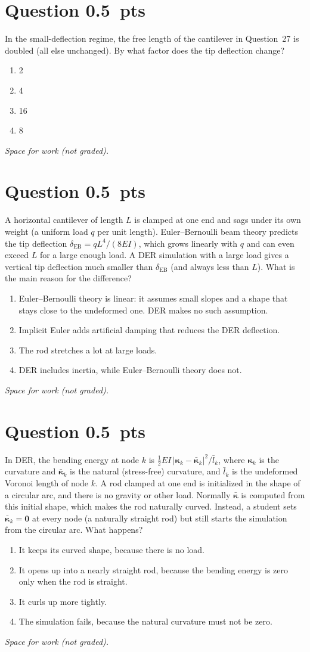 \documentclass[letterpaper,11pt]{article}
\newcounter{qnum}
\newcommand{\qpts}{0.5}
\newcommand{\mcq}[5]{%
  \clearpage
  \stepcounter{qnum}%
  \section*{Question \theqnum \hfill \normalsize \qpts~pts}
  #1
  \begin{enumerate}[label=(\alph*)]
    \item #2
    \item #3
    \item #4
    \item #5
  \end{enumerate}
  \vspace{3mm}

  \textit{Space for work (not graded).}
}
\begin{document}
%
%
\mcq{In the small-deflection regime, the free length of the cantilever in Question~27 is doubled (all else unchanged). By what factor does the tip deflection change?}
  {2}
  {4}
  {16}
  {8}

%
%
\mcq{A horizontal cantilever of length $L$ is clamped at one end and sags under its own weight (a uniform load $q$ per unit length). Euler--Bernoulli beam theory predicts the tip deflection $\delta_{\text{EB}} = qL^4/(8EI)$, which grows linearly with $q$ and can even exceed $L$ for a large enough load. A DER simulation with a large load gives a vertical tip deflection much smaller than $\delta_{\text{EB}}$ (and always less than $L$). What is the main reason for the difference?}
  {Euler--Bernoulli theory is linear: it assumes small slopes and a shape that stays close to the undeformed one. DER makes no such assumption.}
  {Implicit Euler adds artificial damping that reduces the DER deflection.}
  {The rod stretches a lot at large loads.}
  {DER includes inertia, while Euler--Bernoulli theory does not.}

%
%
\mcq{In DER, the bending energy at node $k$ is $\frac{1}{2} EI\, |\boldsymbol{\kappa}_k - \bar{\boldsymbol{\kappa}}_k|^2 / \bar{l}_k$, where $\boldsymbol{\kappa}_k$ is the curvature and $\bar{\boldsymbol{\kappa}}_k$ is the natural (stress-free) curvature, and $\bar{l}_k$ is the undeformed Voronoi length of node $k$. A rod clamped at one end is initialized in the shape of a circular arc, and there is no gravity or other load. Normally $\bar{\boldsymbol{\kappa}}$ is computed from this initial shape, which makes the rod naturally curved. Instead, a student sets $\bar{\boldsymbol{\kappa}}_k = \mathbf{0}$ at every node (a naturally straight rod) but still starts the simulation from the circular arc. What happens?}
  {It keeps its curved shape, because there is no load.}
  {It opens up into a nearly straight rod, because the bending energy is zero only when the rod is straight.}
  {It curls up more tightly.}
  {The simulation fails, because the natural curvature must not be zero.}
\end{document}
